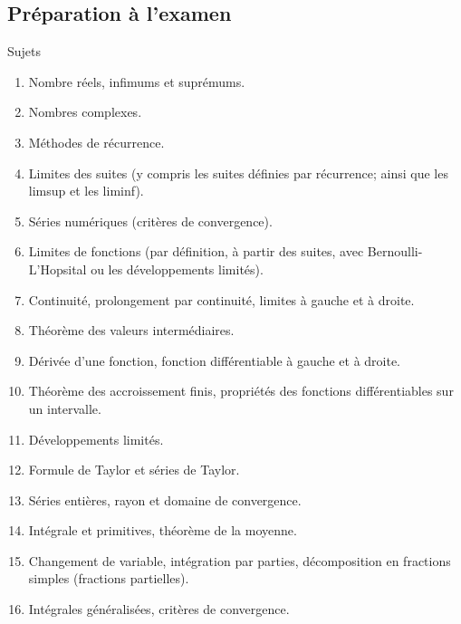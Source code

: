 \documentclass[a4paper]{article}
\begin{document}
\subsection{Préparation à l'examen}
\begin{parag}{Sujets}
    \begin{enumerate}[left=0pt]
        \item Nombre réels, infimums et suprémums.
        \item Nombres complexes.
        \item Méthodes de récurrence.
        \item Limites des  suites (y compris les suites définies par récurrence; ainsi que les limsup et les liminf).
        \item Séries numériques (critères de convergence).
        \item Limites de fonctions (par définition, à partir des suites, avec Bernoulli-L'Hopsital ou les développements limités).
        \item Continuité, prolongement par continuité, limites à gauche et à droite.
        \item Théorème des valeurs intermédiaires.
        \item Dérivée d'une fonction, fonction différentiable à gauche et à droite.
        \item Théorème des accroissement finis, propriétés des fonctions différentiables sur un intervalle.
        \item Développements limités.
        \item Formule de Taylor et séries de Taylor.
        \item Séries entières, rayon et domaine de convergence.
        \item Intégrale et primitives, théorème de la moyenne.
        \item Changement de variable, intégration par parties, décomposition en fractions simples (fractions partielles).
        \item Intégrales généralisées, critères de convergence.
    \end{enumerate}
\end{parag}
\end{document}

